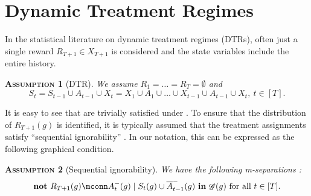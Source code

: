 \documentclass[12pt,a4paper]{article}
\newtheorem{assumption}{\normalfont\scshape Assumption}
\theoremstyle{definition}
\newcommand{\indep}{\perp \!\!\! \perp}
\newcommand{\ingraph}[1]{~\textnormal{\bf in}\,#1}
\newcommand{\textnot}{\textnormal{\bf not}~}
\DeclareMathOperator{\gG}{\mathscr{G}}
\begin{document}



\section{Dynamic Treatment Regimes}\label{sec:dtr}
In the statistical literature on dynamic treatment regimes (DTRs), often just
a single reward $R_{T+1} \in X_{T+1}$ is considered and the state variables include the
entire history.

\begin{assumption}[DTR] \label{assump:DTR}
  We assume $R_1 = \dots = R_T = \emptyset$ and
\begin{equation*} %
  S_t = S_{t-1} \cup A_{t-1} \cup X_t = X_1 \cup A_1 \cup \dots \cup X_{t-1} \cup
  A_{t-1} \cup X_t,~t \in [T].
\end{equation*}
\end{assumption}
It is easy to see that
 are trivially
satisfied under . %
    To ensure that the distribution of $R_{T+1}(g)$ is
identified, it is typically assumed that the treatment assignments satisfy
``sequential ignorability''
\parencite{robins_new_1986,robins_causal_1997,murphy_optimal_2003}. In
our notation, this can be expressed as the following graphical
condition. %
\begin{assumption}[Sequential
  ignorability] \label{assump:dtr_seq_ignorability} We have the
  following m-separations :
\[    \textnot    R_{T+1}(g) \mconn A_t^{-}(g) \mid S_t(g) \cup
\overline{A}^{-}_{t-1}(g) \ingraph{\gG(g)}~\text{for all $t \in
  [T]$}.\] %
  \end{assumption}
\end{document}
